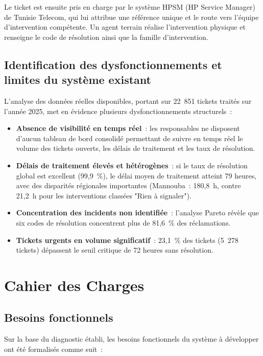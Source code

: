 \documentclass[11pt,a4paper]{report}
\begin{document}
Le ticket est ensuite pris en charge par le système HPSM (HP Service Manager) de Tunisie Telecom, qui lui attribue une référence unique et le route vers l'équipe d'intervention compétente. Un agent terrain réalise l'intervention physique et renseigne le code de résolution ainsi que la famille d'intervention.

\subsection{Identification des dysfonctionnements et limites du système existant}

L'analyse des données réelles disponibles, portant sur 22~851 tickets traités sur l'année 2025, met en évidence plusieurs dysfonctionnements structurels~:

\begin{itemize}
  \item \textbf{Absence de visibilité en temps réel}~: les responsables ne disposent d'aucun tableau de bord consolidé permettant de suivre en temps réel le volume des tickets ouverts, les délais de traitement et les taux de résolution.
  \item \textbf{Délais de traitement élevés et hétérogènes}~: si le taux de résolution global est excellent (99,9~\%), le délai moyen de traitement atteint 79 heures, avec des disparités régionales importantes (Mannouba~: 180,8~h, contre 21,2~h pour les interventions classées "Rien à signaler").
  \item \textbf{Concentration des incidents non identifiée}~: l'analyse Pareto révèle que six codes de résolution concentrent plus de 81,6~\% des réclamations.
  \item \textbf{Tickets urgents en volume significatif}~: 23,1~\% des tickets (5~278 tickets) dépassent le seuil critique de 72 heures sans résolution.
\end{itemize}

\section{Cahier des Charges}

\subsection{Besoins fonctionnels}

Sur la base du diagnostic établi, les besoins fonctionnels du système à développer ont été formalisés comme suit~:
\end{document}
